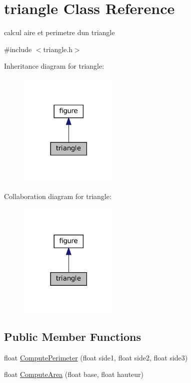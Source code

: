 \hypertarget{classtriangle}{}\section{triangle Class Reference}
\label{classtriangle}


calcul aire et perimetre d\textquotesingle{}un triangle  




{\ttfamily \#include $<$triangle.\+h$>$}



Inheritance diagram for triangle\+:
\nopagebreak
\begin{figure}[H]
\begin{center}
\leavevmode
\includegraphics[width=134pt]{classtriangle__inherit__graph}
\end{center}
\end{figure}


Collaboration diagram for triangle\+:
\nopagebreak
\begin{figure}[H]
\begin{center}
\leavevmode
\includegraphics[width=134pt]{classtriangle__coll__graph}
\end{center}
\end{figure}
\subsection*{Public Member Functions}
\begin{DoxyCompactItemize}
\item 
float \hyperlink{classtriangle_a6bd90bcfd3a2e287577fa7654ee7c8c2}{Compute\+Perimeter} (float side1, float side2, float side3)
\item 
float \hyperlink{classtriangle_aff0e02134612db76cb599a0b85df566f}{Compute\+Area} (float base, float hauteur)
\end{DoxyCompactItemize}


